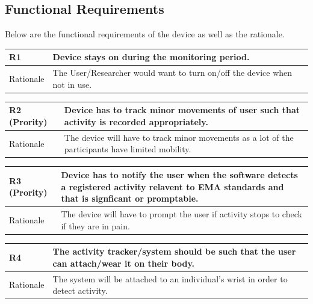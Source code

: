\documentclass[12pt]{article}
\begin{document}
\subsection{Functional Requirements}
Below are the functional requirements of the device as well as the rationale.


\begin{center}
\begin{tabular}{|l|p{14cm}|}
 \hline
 R1 \label{R1} & Device stays on during the monitoring period. \\ [0.5ex]
 \hline
 Rationale &  The User/Researcher would want to turn on/off the device when not in use.\\ 
 \hline
\end{tabular}
\end{center}
\hspace{0.5cm}
\begin{center}
\begin{tabular}{|l|p{14cm}|}
 \hline
 R2 \label{R2} (Prority) & Device has to track minor movements of user such that activity is recorded appropriately.\\ [0.5ex]
 \hline
 Rationale &  The device will have to track minor movements as a lot of the participants have limited mobility.\\ 
 \hline
\end{tabular}
\end{center}
\hspace{0.5em}
\begin{center}
\begin{tabular}{|l|p{14cm}|}
 \hline
 R3 \label{R3}(Prority) &Device has to notify the user when the software detects a registered activity relavent to EMA standards and that is signficant or promptable.\\ [0.5ex]
 \hline
 Rationale &  The device will have to prompt the user if activity stops to check if they are in pain.\\ 
 \hline
\end{tabular}
\end{center}
\hspace{0.5em}
\begin{center}
\begin{tabular}{|l|p{14cm}|}
 \hline
 R4 \label{R4} &The activity tracker/system should be such that the user can attach/wear it on their body.\\ [0.5ex]
 \hline
 Rationale &  The system will be attached to an individual's wrist in order to detect activity.\\ 
 \hline
\end{tabular}
\end{center}
\end{document}

